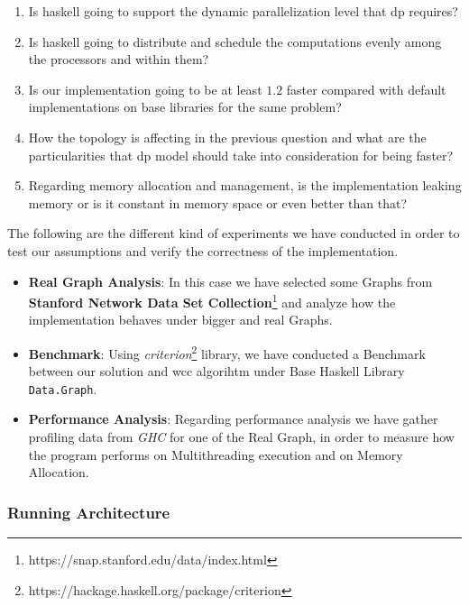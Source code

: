\documentclass[preprint]{elsarticle}
\begin{document}
\begin{enumerate}[Q1.]\label{res:question}
    \item Is \acrshort{haskell} going to support the dynamic parallelization level that \acrshort{dp} requires?\label{q:1}
    \item Is \acrshort{haskell} going to distribute and schedule the computations evenly among the processors and within them?\label{q:2}
    \item Is our implementation going to be at least $1.2$ faster compared with default implementations on base libraries for the same problem?\label{q:3}
    \item How the topology is affecting in the previous question and what are the particularities that \acrshort{dp} model should take into consideration for being faster?\label{q:4}
    \item Regarding memory allocation and management, is the implementation leaking memory or is it constant in memory space or even better than that?\label{q:5} 
\end{enumerate}

The following are the different kind of experiments we have conducted in order to test our assumptions and verify the correctness of the implementation.

\begin{itemize}
  \item \textbf{Real Graph Analysis}: In this case we have selected some Graphs from \textbf{Stanford Network Data Set Collection}\footnote{https://snap.stanford.edu/data/index.html} and analyze how the implementation
  behaves under bigger and real Graphs.
  \item \textbf{Benchmark}: Using \textit{criterion}\footnote{https://hackage.haskell.org/package/criterion} library, we have conducted a Benchmark between our solution and \acrshort{wcc} algorihtm under Base Haskell Library \texttt{Data.Graph}.
  \item \textbf{Performance Analysis}: Regarding performance analysis we have gather profiling data from \textit{GHC} for one of the Real Graph, in order to measure how the program performs on Multithreading execution and 
  on Memory Allocation.
\end{itemize}

\subsubsection{\textbf{Running Architecture}}
\end{document}
